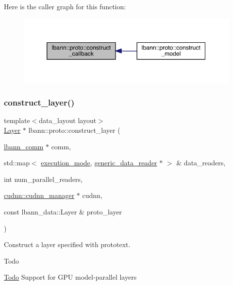Here is the caller graph for this function\+:\nopagebreak
\begin{figure}[H]
\begin{center}
\leavevmode
\includegraphics[width=346pt]{namespacelbann_1_1proto_a00597c8b7450c389847980cf6934a619_icgraph}
\end{center}
\end{figure}
\mbox{\label{namespacelbann_1_1proto_a7e4b0a66836712b1713ae4a121453cde}} 
\subsubsection{\texorpdfstring{construct\+\_\+layer()}{construct\_layer()}}
{\footnotesize\ttfamily template$<$data\+\_\+layout layout$>$ \\
\hyperlink{classlbann_1_1Layer}{Layer} $\ast$ lbann\+::proto\+::construct\+\_\+layer (\begin{DoxyParamCaption}\item[{\hyperlink{classlbann_1_1lbann__comm}{lbann\+\_\+comm} $\ast$}]{comm,  }\item[{std\+::map$<$ \hyperlink{base_8hpp_a2781a159088df64ed7d47cc91c4dc0a8}{execution\+\_\+mode}, \hyperlink{classlbann_1_1generic__data__reader}{generic\+\_\+data\+\_\+reader} $\ast$ $>$ \&}]{data\+\_\+readers,  }\item[{int}]{num\+\_\+parallel\+\_\+readers,  }\item[{\hyperlink{classlbann_1_1cudnn_1_1cudnn__manager}{cudnn\+::cudnn\+\_\+manager} $\ast$}]{cudnn,  }\item[{const lbann\+\_\+data\+::\+Layer \&}]{proto\+\_\+layer }\end{DoxyParamCaption})}

Construct a layer specified with prototext. \begin{DoxyRefDesc}{Todo}
\item[\hyperlink{todo__todo000006}{Todo}]Support for G\+PU model-\/parallel layers \end{DoxyRefDesc}


